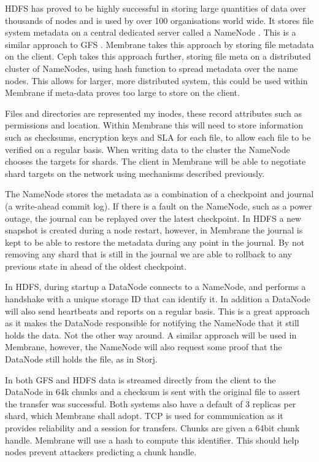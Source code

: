 \documentclass[11pt, a4paper, twocolumn, twoside]{report}
\begin{document}
HDFS has proved to be highly successful in storing large quantities of data over thousands of nodes and is used by over 100 organisations world wide. It stores file system metadata on a central dedicated server called a NameNode \citep{hdfsAnalysis}. This is a similar approach to GFS \citep{mckusick2010gfs}. Membrane takes this approach by storing file metadata on the client. Ceph takes this approach further, storing file meta on a distributed cluster of NameNodes, using hash function to spread metadata over the name nodes. \citep{weil2006ceph} This allows for larger, more distributed system, this could be used within Membrane if meta-data proves too large to store on the client.

Files and directories are represented my inodes, these record attributes such as permissions and location. Within Membrane this will need to store information such as checksums, encryption keys and SLA for each file, to allow each file to be verified on a regular basis. When writing data to the cluster the NameNode chooses the targets for shards. The client in Membrane will be able to negotiate shard targets on the network using mechanisms described previously.

The NameNode stores the metadata as a combination of a checkpoint and journal (a write-ahead commit log). If there is a fault on the NameNode, such as a power outage, the journal can be replayed over the latest checkpoint. In HDFS a new snapshot is created during a node restart, however, in Membrane the journal is kept to be able to restore the metadata during any point in the journal. By not removing any shard that is still in the journal we are able to rollback to any previous state in ahead of the oldest checkpoint.

In HDFS, during startup a DataNode connects to a NameNode, and performs a handshake with a unique storage ID that can identify it. In addition a DataNode will also send heartbeats and reports on a regular basis. \cite{hdfsAnalysis} This is a great approach as it makes the DataNode responsible for notifying the NameNode that it still holds the data. Not the other way around. A similar approach will be used in Membrane, however, the NameNode will also request some proof that the DataNode still holds the file, as in Storj.

In both GFS and HDFS data is streamed directly from the client to the DataNode in 64k chunks and a checksum is sent with the original file to assert the transfer was successful. Both systems also have a default of 3 replicas per shard, which Membrane shall adopt. TCP is used for communication as it provides reliability and a session for transfers. Chunks are given a 64bit chunk handle. Membrane will use a hash to compute this identifier. This should help nodes prevent attackers predicting a chunk handle.
\end{document}
